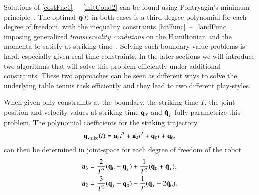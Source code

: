 Solutions of \mbox{\eqref{costFnc1} -- \eqref{initCond2}} can be found using Pontryagin's minimum principle~\citep{Pontryagin}. The optimal $\boldsymbol{\mathrm{q}}(t)$ in both cases is a third degree polynomial for each degree of freedom, with the inequality constraints \mbox{\eqref{hitFunc} -- \eqref{landFunc}} imposing generalized \emph{transversality conditions} on the Hamiltonian and the momenta to satisfy at striking time~\citep{BrysonHo69,Schaettler12}. Solving such boundary value problems is hard, especially given real time constraints. In the later sections we will introduce two algorithms that will solve this problem efficiently under additional constraints. These two approaches can be seen as different ways to solve the underlying table tennis task efficiently and they lead to two different play-styles. 


When given only constraints at the boundary, the striking time $T$, the joint position and velocity values at striking time $\boldsymbol{\mathrm{q}}_f$ and $\dot{\boldsymbol{\mathrm{q}}}_f$ fully parametrize this problem. The polynomial coefficients for the striking trajectory
%
\begin{align}
\boldsymbol{\mathrm{q}}_{\mathrm{strike}}(t) = \boldsymbol{\mathrm{a}}_3 t^3  + \boldsymbol{\mathrm{a}}_2 t^2 + \dot{\boldsymbol{\mathrm{q}}}_0 t + \boldsymbol{\mathrm{q}}_0, 
\end{align} %
%
\noindent can then be determined in joint-space for each degree of freedom of the robot
%
\begin{gather}
\begin{aligned}
\boldsymbol{\mathrm{a}}_3 &= \frac{2}{T^3}(\boldsymbol{\mathrm{q}}_0 - \boldsymbol{\mathrm{q}}_f) + \frac{1}{T^2}(\dot{\boldsymbol{\mathrm{q}}}_0 + \dot{\boldsymbol{\mathrm{q}}}_f), \\
\boldsymbol{\mathrm{a}}_2 &= \frac{3}{T^2}(\boldsymbol{\mathrm{q}}_f - \boldsymbol{\mathrm{q}}_0) - \frac{1}{T}(\dot{\boldsymbol{\mathrm{q}}}_f + 2\dot{\boldsymbol{\mathrm{q}}}_0).
\label{coeffs}
\end{aligned}
\end{gather}
%

